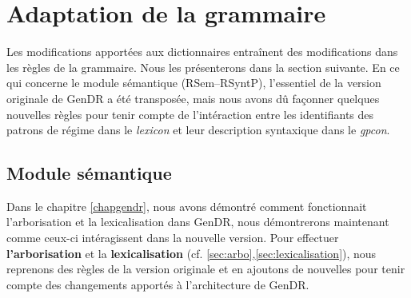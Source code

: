 \section{Adaptation de la grammaire}

Les modifications apportées aux dictionnaires entraînent des modifications dans les règles de la grammaire. Nous les présenterons dans la section suivante. En ce qui concerne le module sémantique (\ac{RSem}--\ac{RSyntP}), l'essentiel de la version originale de GenDR a été transposée, mais nous avons dû façonner quelques nouvelles règles pour tenir compte de l'intéraction entre les identifiants des patrons de régime dans le \emph{lexicon} et leur description syntaxique dans le \emph{gpcon}.

\subsection{Module sémantique}

Dans le chapitre \ref{chapgendr}, nous avons démontré comment fonctionnait l'arborisation et la lexicalisation dans GenDR, nous démontrerons maintenant comme ceux-ci intéragissent dans la nouvelle version. Pour effectuer \textbf{l'arborisation} et la \textbf{lexicalisation} (cf. \ref{sec:arbo},\ref{sec:lexicalisation}), nous reprenons des règles de la version originale et en ajoutons de nouvelles pour tenir compte des changements apportés à l'architecture de GenDR. 

